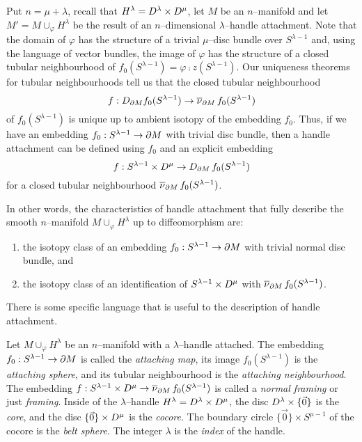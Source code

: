 Put $n=\mu+\lambda$, recall that $H^\lambda=D^\lambda\times D^\mu$, let $M$ be an $n$--manifold and let $M'=M\cup_\varphi H^\lambda$ be the result of an $n$--dimensional $\lambda$--handle attachment.
Note that the domain of $\varphi$ has the structure of a trivial $\mu$--disc bundle over $S^{\lambda-1}$ and, using the language of vector bundles, the image of $\varphi$ has the structure of a closed tubular neighbourhood of $f_0(S^{\lambda-1})=\varphi\comp z(S^{\lambda-1})$.
Our uniqueness theorems for tubular neighbourhoods tell us that the closed tubular neighbourhood
\[
	f:D_{\partial M}f_0(S^{\lambda-1})\to\overline{\nu}_{\partial M}\,f_0(S^{\lambda-1})
\]
of $f_0(S^{\lambda-1})$ is unique up to ambient isotopy of the embedding $f_0$.
Thus, if we have an embedding $f_0:S^{\lambda-1}\to \partial M$ with trivial disc bundle, then a handle attachment can be defined using $f_0$ and an explicit embedding 
\[
	f: S^{\lambda-1}\times D^\mu\to D_{\partial M}\,f_0(S^{\lambda-1})
\]
for a closed tubular neighbourhood $\overline{\nu}_{\partial M}\,f_0(S^{\lambda-1})$.

In other words, the characteristics of handle attachment that fully describe the smooth $n$--manifold $M\cup_\varphi H^\lambda$ up to diffeomorphism are:
\begin{enumerate}
	\item the isotopy class of an embedding $f_0:S^{\lambda-1}\to\partial M$ with trivial normal disc bundle, and 
	\item the isotopy class of an identification of $S^{\lambda-1}\times D^\mu$ with $\overline{\nu}_{\partial M}\,f_0(S^{\lambda-1})$.
\end{enumerate}

There is some specific language that is useful to the description of handle attachment.

\begin{defn}
	Let $M\cup_\varphi H^\lambda$ be an $n$--manifold with a $\lambda$--handle attached.
	The embedding $f_0:S^{\lambda-1}\to\partial M$ is called the \emph{attaching map}, its image $f_0(S^{\lambda-1})$ is the \emph{attaching sphere}, and its tubular neighbourhood is the \emph{attaching neighbourhood}.
	The embedding $f: S^{\lambda-1}\times D^\mu\to \overline{\nu}_{\partial M}\,f_0(S^{\lambda-1})$ is called a \emph{normal framing} or just \emph{framing}.
	Inside of the $\lambda$--handle $H^\lambda=D^\lambda\times D^\mu$, the disc $D^\lambda\times\{\vec{0}\}$ is the \emph{core}, and the disc $\{\vec{0}\}\times D^\mu$ is the \emph{cocore}.
	The boundary circle $\{\vec{0}\}\times S^{\mu-1}$ of the cocore is the \emph{belt sphere}.
	The integer $\lambda$ is the \emph{index} of the handle.
\end{defn}

